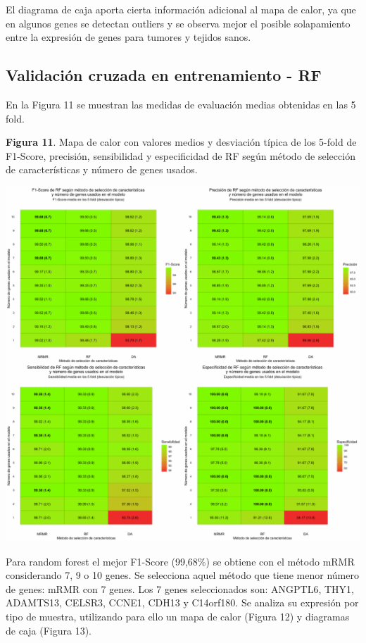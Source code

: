 El diagrama de caja aporta cierta información adicional al mapa de calor, ya que en algunos genes se detectan outliers y se observa mejor el posible solapamiento entre la expresión de genes para tumores y tejidos sanos.

\newpage
\subsection{Validación cruzada en entrenamiento - RF}

En la Figura 11 se muestran las medidas de evaluación medias obtenidas en las 5 fold.\\

\begin{center}
\textbf{Figura 11}. Mapa de calor con valores medios y desviación típica de los 5-fold de F1-Score, precisión, sensibilidad y especificidad de RF según método de selección de características y número de genes usados.
\end{center}
\begin{center}
	\includegraphics[width=1\textwidth]{figuras/11_higado_biclase_heatmap_rf.pdf} 
\end{center}

Para random forest el mejor F1-Score (99,68\%) se obtiene con el método mRMR considerando 7, 9 o 10 genes. Se selecciona aquel método que tiene menor número de genes: mRMR con 7 genes. Los 7 genes seleccionados son: ANGPTL6, THY1, ADAMTS13, CELSR3, CCNE1, CDH13 y C14orf180. Se analiza su expresión por tipo de muestra, utilizando para ello un mapa de calor (Figura 12) y diagramas de caja (Figura 13).\\

